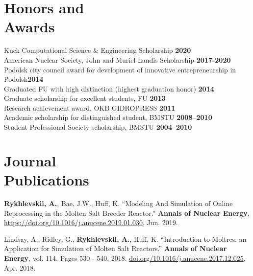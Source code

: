 \documentclass[margin,line]{resume}
\newcommand{\Cyclus}{\textsc{Cyclus}\xspace}%
\begin{document}
\begin{resume}
    \section{\mysidestyle Honors and\\Awards}
        Kuck Computational Science \& Engineering Scholarship\hfill 
        \textbf{2020}\vspace{.5mm}\\%
        American Nuclear Society, John and Muriel Landis Scholarship\hfill 
        \textbf{2017-2020}\vspace{.5mm}\\%
		Podolsk city council award for development of innovative entrepreneurship in Podolsk\hfill \textbf{2014}\vspace{.5mm}\\%
		Graduated FU with high distinction (highest graduation honor)                \hfill \textbf{2014}\vspace{.5mm}\\%
		Graduate scholarship for excellent students, FU                              \hfill \textbf{2013}\vspace{.5mm}\\%
		Research achievement award, OKB GIDROPRESS                                   \hfill\textbf{2011}\vspace{.5mm}\\%
		Academic scholarship for distinguished student, BMSTU		                 \hfill\textbf{2008--2010}\vspace{.5mm}\\%
		Student Professional Society scholarship, 
		BMSTU                                \hfill\textbf{2004--2010}%
 
    \section{\mysidestyle Journal\\Publications}
      \begin{bibenum}
	    \item \textbf{Rykhlevskii, A.}, Bae, J.W., Huff, K. ``Modeling And 
	    Simulation of Online Reprocessing in the Molten Salt Breeder 
	    Reactor.'' \textbf{Annals of Nuclear Energy}, 
               \url{https://doi.org/10.1016/j.anucene.2019.01.030}, 
               Jun. 2019.
       \item Lindsay, A., Ridley, G., \textbf{Rykhlevskii, A.}, Huff, K. ``Introduction to 
               Moltres: an Application for Simulation of Molten Salt 
               Reactors.''  \textbf{Annals of Nuclear Energy}, vol. 114, Pages 530 - 540, 2018. \url{doi.org/10.1016/j.anucene.2017.12.025}, Apr. 2018.
      \end{bibenum}
\vspace{2mm} %

\end{resume}
\end{document}
